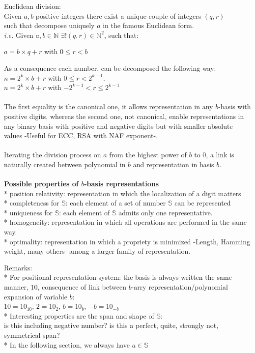 \begin{mydef}{Euclidean division:} \\
	Given $a,b $ positive integers there exist a unique couple of integers $ (q,r)$ \\
	such that decompose uniquely $a$ in the famous Euclidean form.\\
	\textit{i.e.} Given $a,b \in \mathbb{N}$ $\exists! (q,r) \in \mathbb{N}^2$, such that:
	\begin{center}
			$a = b \times q + r$ with $0\leq r <b$\\
	\end{center}
\end{mydef}		 
		As a consequence each number, can be decomposed the following way:\\
		$n = 2^k \times b  + r$ with $0 \leq r <2^{k-1}$. \\
		$n = 2^k \times b + r$ with $-2^{k-1}<r \leq 2^{k-1}$ \\\\
		The first equality is the canonical one, it allows representation in any $b$-basis with positive digits, whereas the second one, not canonical, enable representations in any binary basis with positive and negative digits but with 
		smaller absolute values -Useful for ECC, RSA with NAF exponent-.\\\\
		Iterating the division process on $a$ from the highest power of $b$ to 0, a link is naturally created between polynomial in $b$ and representation in basis $b$.\\\\
\textbf{Possible properties of $b$-basis representations}\\
* position relativity: representation in which the localization of a digit matters\\
* completeness for $\mathbb{S}$: each element of a set of number $\mathbb{S}$ can be represented\\
* uniqueness for $\mathbb{S}$: each element of $\mathbb{S}$ admits only one representative.\\
* homogeneity: representation in which all operations are performed in the same way.\\
* optimality: representation in which a propriety is minimized -Length, Hamming weight, many others-
among a larger family of representation.

Remarks:\\
* For positional representation system:
the basis is always written the same manner, $10$, consequence of link between $b$-arry representation/polynomial expansion of variable $b$:\\
$ 10 = 10_{10} $, $ 2 = 10_{2} $, $ b = 10_{b} $, $ -b = 10_{-b} $ \\
* Interesting properties are the span and shape of $\mathbb{S}$:\\
is this including negative number? is this a perfect, quite, strongly not, symmetrical span?\\
* In the following section, we always have $a \in \mathbb{S}$


